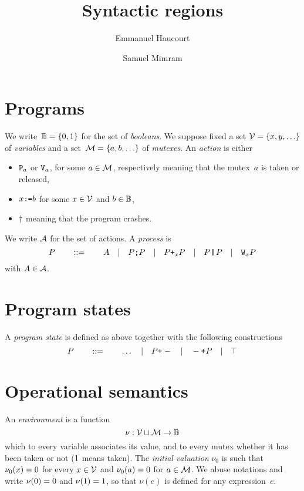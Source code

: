 \documentclass[a4paper]{article}
\title{Syntactic regions}
\author{Emmanuel Haucourt \and Samuel Mimram}
\theoremstyle{theorem}
\theoremstyle{example}
\theoremstyle{remark}
\begin{document}
\maketitle

\section{Programs}
We write~$\B=\set{\Bfalse,\Btrue}$ for the set of \emph{booleans}. We suppose
fixed a set $\variables=\set{x,y,\ldots}$ of \emph{variables} and a
set~$\mutexes=\set{a,b,\ldots}$ of \emph{mutexes}.
An \emph{action} is either
\begin{itemize}
\item $\P a$ or $\V a$, for some $a\in\mutexes$, respectively meaning that the
  mutex~$a$ is taken or released,
\item $\pset x b$ for some $x\in\variables$ and $b\in\B$,
\item $\pdie$ meaning that the program crashes.
\end{itemize}
We write $\actions$ for the set of actions. A \emph{process} is
\[
  P
  \qquad::=\qquad
  A
  \quad|\quad
  \pseq PP
  \quad|\quad
  \por xPP
  \quad|\quad
  \ppar PP
  \quad|\quad
  \ploop xP
\]
with $A\in\actions$.

\section{Program states}
A \emph{program state} is defined as above together with the following
constructions
\[
  P
  \qquad::=\qquad
  \ldots
  \quad|\quad
  \porl P
  \quad|\quad
  \porr P
  \quad|\quad
  \pskip
\]

\section{Operational semantics}
An
\emph{environment} is a function
\[
  \nu:\variables\sqcup\mutexes\to\B
\]
which to every variable associates its value, and to every mutex whether it has
been taken or not ($\Btrue$ means taken). The \emph{initial valuation} $\nu_0$
is such that $\nu_0(x)=\Bfalse$ for every $x\in\variables$ and
$\nu_0(a)=\Bfalse$ for $a\in\mutexes$. We abuse notations and write
$\nu(\Bfalse)=\Bfalse$ and $\nu(\Btrue)=\Btrue$, so that $\nu(e)$ is defined for
any expression~$e$.
\end{document}
